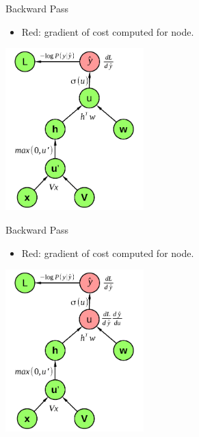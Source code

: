 
\begin{vbframe}{Backward Pass}

\vfill

\begin{itemize}
\item Red: gradient of cost computed for node.
\end{itemize}
\begin{center}
\includegraphics[width = 0.4\textwidth]{./figure/relu_sigmoid_graph_with_loss_backward}
\end{center}

\vfill

\end{vbframe}



\begin{vbframe}{Backward Pass}

\vfill

\begin{itemize}
\item Red: gradient of cost computed for node.
\end{itemize}
\begin{center}
\includegraphics[width = 0.4\textwidth]{./figure/relu_sigmoid_graph_with_loss_backward2}
\end{center}

\vfill

\end{vbframe}


